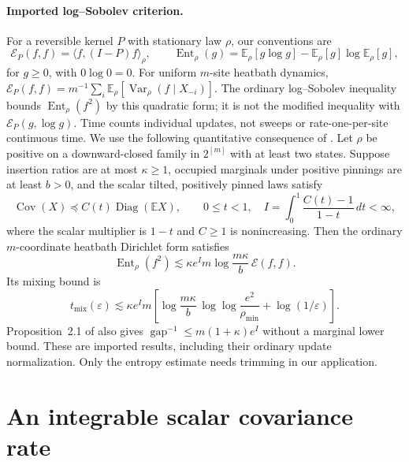 \documentclass[11pt]{article}
\theoremstyle{remark}\newtheorem{remark}[theorem]{Remark}
\newcommand{\Cov}{\operatorname{Cov}}
\newcommand{\Var}{\operatorname{Var}}
\newcommand{\Ent}{\operatorname{Ent}}
\newcommand{\diag}{\operatorname{Diag}}
\newcommand{\E}{\mathbb E}
\begin{document}
\paragraph{Imported log--Sobolev criterion.}
For a reversible kernel $P$ with stationary law $\rho$, our conventions are
\[
 \mathcal E_P(f,f)=\langle f,(I-P)f\rangle_\rho,
 \qquad \Ent_\rho(g)=\E_\rho[g\log g]-\E_\rho[g]\log\E_\rho[g],
\]
for $g\geq0$, with $0\log0=0$.
For uniform $m$-site heatbath dynamics,
$\mathcal E_P(f,f)=m^{-1}\sum_i\E_\rho[\Var_\rho(f\mid X_{-i})]$.
The ordinary log--Sobolev inequality bounds $\Ent_\rho(f^2)$ by this
quadratic form; it is not the modified inequality with
$\mathcal E_P(g,\log g)$. Time counts individual updates, not sweeps or
rate-one-per-site continuous time.
We use the following quantitative consequence of
\cite[Definition~1.1, Theorem~1.4 and Section~2.1]{MY26}.
Let $\rho$ be positive on a downward-closed family in $2^{[m]}$ with at
least two states. Suppose insertion ratios are at most $\kappa\geq1$,
occupied marginals under positive pinnings are at least $b>0$, and
the scalar tilted, positively pinned laws satisfy
\[
 \Cov(X)\preceq C(t)\diag(\E X),\qquad 0\leq t<1,
 \quad I=\int_0^1\frac{C(t)-1}{1-t}\,dt<\infty,
\]
where the scalar multiplier is $1-t$ and $C\geq1$ is nonincreasing.
Then the ordinary $m$-coordinate heatbath Dirichlet form satisfies
\begin{equation}\label{eq:MY}
 \Ent_\rho(f^2)\lesssim
 \kappa e^I m\log\frac{m\kappa}{b}\,\mathcal E(f,f).
\end{equation}
Its mixing bound is
\begin{equation}\label{eq:MYmix}
 t_{\mathrm{mix}}(\varepsilon)\lesssim
 \kappa e^I m\left[
 \log\frac{m\kappa}{b}\,
 \log\log\frac{e^2}{\rho_{\min}}+\log(1/\varepsilon)\right].
\end{equation}
Proposition~2.1 of \cite{MY26} also gives
$\operatorname{gap}^{-1}\leq m(1+\kappa)e^I$ without a marginal lower
bound. These are imported results, including their ordinary update
normalization. Only the entropy estimate needs trimming in our application.

\section{An integrable scalar covariance rate}
\end{document}
